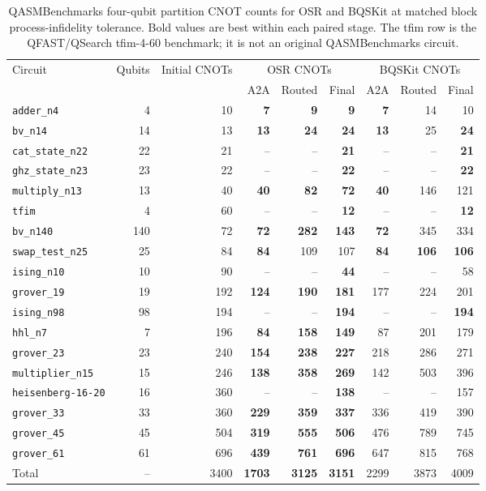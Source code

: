 \begin{table}[p]
\centering
\scriptsize
\begin{tabular}{lrr|rrr|rrr}
\hline
Circuit & Qubits & Initial CNOTs & \multicolumn{3}{c|}{OSR CNOTs} & \multicolumn{3}{c}{BQSKit CNOTs} \\
 & & & A2A & Routed & Final & A2A & Routed & Final \\
\hline
\texttt{adder\_n4} & 4 & 10 & \textbf{7} & \textbf{9} & \textbf{9} & \textbf{7} & 14 & 10 \\
\texttt{bv\_n14} & 14 & 13 & \textbf{13} & \textbf{24} & \textbf{24} & \textbf{13} & 25 & \textbf{24} \\
\texttt{cat\_state\_n22} & 22 & 21 & -- & -- & \textbf{21} & -- & -- & \textbf{21} \\
\texttt{ghz\_state\_n23} & 23 & 22 & -- & -- & \textbf{22} & -- & -- & \textbf{22} \\
\texttt{multiply\_n13} & 13 & 40 & \textbf{40} & \textbf{82} & \textbf{72} & \textbf{40} & 146 & 121 \\
\texttt{tfim} & 4 & 60 & -- & -- & \textbf{12} & -- & -- & \textbf{12} \\
\texttt{bv\_n140} & 140 & 72 & \textbf{72} & \textbf{282} & \textbf{143} & \textbf{72} & 345 & 334 \\
\texttt{swap\_test\_n25} & 25 & 84 & \textbf{84} & 109 & 107 & \textbf{84} & \textbf{106} & \textbf{106} \\
\texttt{ising\_n10} & 10 & 90 & -- & -- & \textbf{44} & -- & -- & 58 \\
\texttt{grover\_19} & 19 & 192 & \textbf{124} & \textbf{190} & \textbf{181} & 177 & 224 & 201 \\
\texttt{ising\_n98} & 98 & 194 & -- & -- & \textbf{194} & -- & -- & \textbf{194} \\
\texttt{hhl\_n7} & 7 & 196 & \textbf{84} & \textbf{158} & \textbf{149} & 87 & 201 & 179 \\
\texttt{grover\_23} & 23 & 240 & \textbf{154} & \textbf{238} & \textbf{227} & 218 & 286 & 271 \\
\texttt{multiplier\_n15} & 15 & 246 & \textbf{138} & \textbf{358} & \textbf{269} & 142 & 503 & 396 \\
\texttt{heisenberg-16-20} & 16 & 360 & -- & -- & \textbf{138} & -- & -- & 157 \\
\texttt{grover\_33} & 33 & 360 & \textbf{229} & \textbf{359} & \textbf{337} & 336 & 419 & 390 \\
\texttt{grover\_45} & 45 & 504 & \textbf{319} & \textbf{555} & \textbf{506} & 476 & 789 & 745 \\
\texttt{grover\_61} & 61 & 696 & \textbf{439} & \textbf{761} & \textbf{696} & 647 & 815 & 768 \\
\hline
Total & -- & 3400 & \textbf{1703} & \textbf{3125} & \textbf{3151} & 2299 & 3873 & 4009 \\
\hline
\end{tabular}
\caption{QASMBenchmarks four-qubit partition CNOT counts for OSR and BQSKit at matched block process-infidelity tolerance. Bold values are best within each paired stage. The tfim row is the QFAST/QSearch tfim-4-60 benchmark; it is not an original QASMBenchmarks circuit.}
\label{tab:osr-bqskit-four-qubit-qasm-benchmarks-counts}
\end{table}
